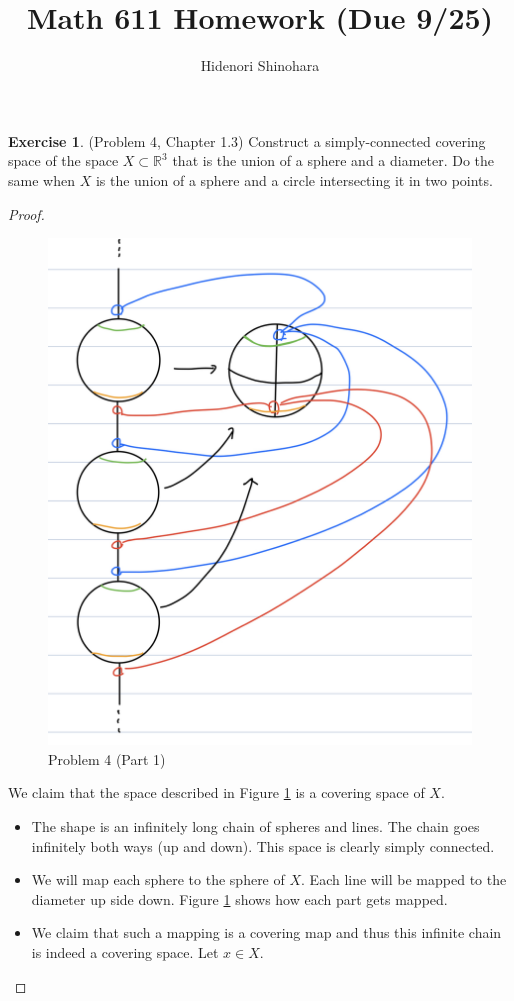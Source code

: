 \documentclass[12pt, psamsfonts]{amsart}
\theoremstyle{definition}
\newtheorem*{exer}{Exercise}
\theoremstyle{remark}
\numberwithin{equation}{section}
\begin{document}
\title{Math 611 Homework (Due 9/25)}
\author{Hidenori Shinohara}
\maketitle

\begin{exer}{(Problem 4, Chapter 1.3)}
  Construct a simply-connected covering space of the space $X \subset \mathbb{R}^3$ that is the union of a sphere and a diameter.
  Do the same when $X$ is the union of a sphere and a circle intersecting it in two points.
\end{exer}

\begin{proof}
  \begin{figure}
    \includegraphics[width=.5\linewidth]{problem4-1.jpeg}
    \caption{Problem 4 (Part 1)}
    \label{fig:prob4_1}
  \end{figure}
  We claim that the space described in Figure \ref{fig:prob4_1} is a covering space of $X$.
  \begin{itemize}
    \item
      The shape is an infinitely long chain of spheres and lines.
      The chain goes infinitely both ways (up and down).
      This space is clearly simply connected.
    \item
      We will map each sphere to the sphere of $X$.
      Each line will be mapped to the diameter up side down.
      Figure \ref{fig:prob4_1} shows how each part gets mapped.
    \item
      We claim that such a mapping is a covering map and thus this infinite chain is indeed a covering space.
      Let $x \in X$.
  \end{itemize}
\end{proof}
\end{document}
